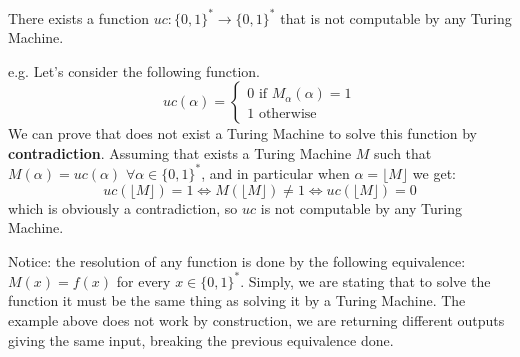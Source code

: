 \begin{definition}[title = Theorem]
    There exists a function $uc: \{0,1\}^* \rightarrow \{0,1\}^*$ that is not computable by any Turing Machine.
\end{definition}
\begin{example}
    e.g. Let's consider the following function. 
    $$ uc(\alpha) = \begin{cases} 0 \text{ if } M_{\alpha}(\alpha) = 1 \\ 1 \text{ otherwise} \end{cases} $$
    We can prove that does not exist a Turing Machine to solve this function by \textbf{contradiction}. Assuming that exists a Turing Machine $M$ such that
    $M(\alpha) = uc(\alpha)$ $\forall \alpha \in \{0,1\}^*$, and in particular when $\alpha = \lfloor M \rfloor$ we get:
    $$ uc(\lfloor M \rfloor) = 1 \iff M(\lfloor M \rfloor) \neq 1 \iff uc(\lfloor M \rfloor) = 0 $$
    which is obviously a contradiction, so $uc$ is not computable by any Turing Machine.
\end{example}
Notice: the resolution of any function is done by the following equivalence: $M(x) = f(x)$ for every $x \in \{0,1\}^*$. Simply, we are stating that to solve 
the function it must be the same thing as solving it by a Turing Machine. The example above does not work by construction, we are returning different outputs 
giving the same input, breaking the previous equivalence done.